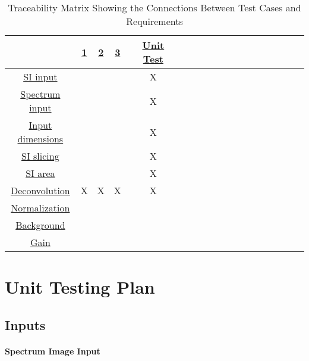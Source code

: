 \documentclass[12pt, titlepage]{article}
\begin{document}
\begin{table}[H]
	\centering
	\begin{tabular}{|c|c|c|c|c|c|c|c|c|c|c|c|c|c|c|c|c|c|c|c|}
		\hline 
		& \hyperref[TFR:RLblankPSF]{1} & \hyperref[TFR:RLerror]{2} & \hyperref[TFR:RLSNR]{3} & & \hyperref[sec:UnitTest]{Unit Test} \\
		\hline
		\hyperref[R_SI_inputs]{SI input}     			&  &  &  &  & X \\ 
		\hline
		\hyperref[R_spectrum_inputs]{Spectrum input}    &  &  &  &  & X \\ 
		\hline
		\hyperref[R_Input_dimension]{Input dimensions}  &  &  &  &  & X \\
		\hline
		\hyperref[R_Input_dimension]{SI slicing}		&  &  &  &  & X \\ 
		\hline
		\hyperref[R_SI_area]{SI area}          			&  &  &  &  & X \\ 
		\hline
		\hyperref[R_deconvolution]{Deconvolution}       & X & X & X &  & X \\ 
		\hline
		\hyperref[R_normalization]{Normalization} 		&  &  &  &  &  \\ 
		\hline
		\hyperref[R_normalization]{Background} 			&  &  &  &  &  \\ 
		\hline
		\hyperref[R_normalization]{Gain}  				&  &  &  &  &  \\ 
		\hline
	\end{tabular}
	\caption{Traceability Matrix Showing the Connections Between Test Cases and
Requirements}
	\label{Table:A_trace}
\end{table}

				
\section{Unit Testing Plan}
\label{sec:UnitTest}

\subsection{Inputs}
		
\paragraph{Spectrum Image Input}
\end{document}

